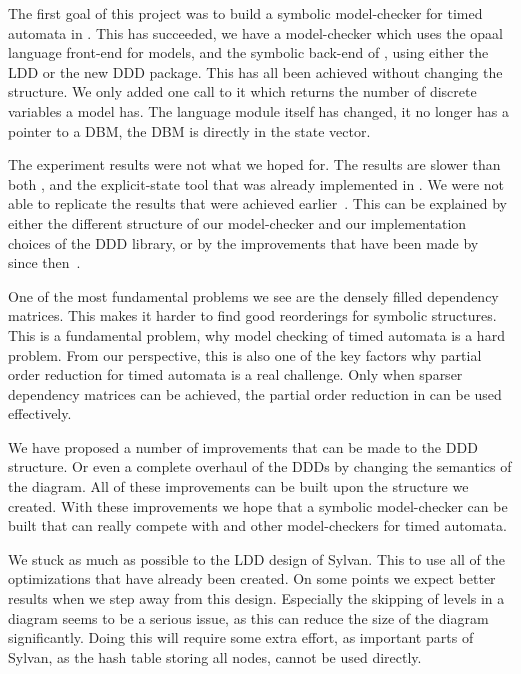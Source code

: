 The first goal of this project was to build a symbolic model-checker for timed automata in \ltsmin{}. This has succeeded, we have a model-checker which uses the opaal language front-end for \uppaal{} models, and the symbolic back-end of \ltsmin{}, using either the LDD or the new DDD package. This has all been achieved without changing the \pins{} structure. We only added one call to it which returns the number of discrete variables a model has. The language module itself has changed, it no longer has a pointer to a DBM, the DBM is directly in the state vector. 

The experiment results were not what we hoped for. The results are slower than both \uppaal{}, and the explicit-state tool that was already implemented in \ltsmin{}. We were not able to replicate the results that were achieved earlier~\cite{ddds}. This can be explained by either the different structure of our model-checker and our implementation choices of the DDD library, or by the improvements that have been made by \uppaal{} since then~\cite{bbdlpw-ftrtft02}. 

One of the most fundamental problems we see are the densely filled dependency matrices. This makes it harder to find good reorderings for symbolic structures. This is a fundamental problem, why model checking of timed automata is a hard problem. From our perspective, this is also one of the key factors why partial order reduction for timed automata is a real challenge. Only when sparser dependency matrices can be achieved, the partial order reduction in \ltsmin{} can be used effectively. 

We have proposed a number of improvements that can be made to the DDD structure. Or even a complete overhaul of the DDDs by changing the semantics of the diagram. All of these improvements can be built upon the structure we created. With these improvements we hope that a symbolic model-checker can be built that can really compete with \uppaal{} and other model-checkers for timed automata. 

We stuck as much as possible to the LDD design of Sylvan. This to use all of the optimizations that have already been created. On some points we expect better results when we step away from this design. Especially the skipping of levels in a diagram seems to be a serious issue, as this can reduce the size of the diagram significantly. Doing this will require some extra effort, as important parts of Sylvan, as the hash table storing all nodes, cannot be used directly. 

